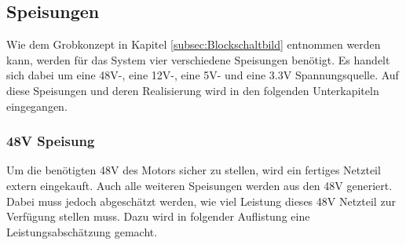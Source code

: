 \subsection{Speisungen}
\label{subsec:Detailkonzept_Speisungen}

Wie dem Grobkonzept in Kapitel \ref{subsec:Blockschaltbild} entnommen werden kann, werden für das System vier verschiedene Speisungen benötigt. Es handelt sich dabei um eine 48V-, eine 12V-, eine 5V- und eine 3.3V Spannungsquelle. Auf diese Speisungen und deren Realisierung wird in den folgenden Unterkapiteln eingegangen. 

\subsubsection{48V Speisung}\label{subsubsec:48V_Speisung}

Um die benötigten 48V des Motors sicher zu stellen, wird ein fertiges Netzteil extern eingekauft. Auch alle weiteren Speisungen werden aus den 48V generiert.  Dabei muss jedoch abgeschätzt werden, wie viel Leistung dieses 48V Netzteil zur Verfügung stellen muss. Dazu wird in folgender Auflistung eine Leistungsabschätzung gemacht.

